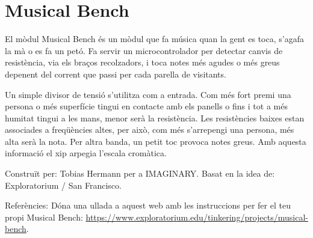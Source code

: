 \section{Musical Bench}
El mòdul Musical Bench és un mòdul que fa música quan la gent es toca, s'agafa la mà o es fa un petó. Fa servir un microcontrolador per detectar canvis de resistència, via els braços recolzadors, i toca notes més agudes o més greus depenent del corrent que passi per cada parella de visitants. 

Un simple divisor de tensió s'utilitza com a entrada. Com més fort premi una persona o més superfície tingui en contacte amb els panells o fins i tot a més humitat tingui a les mans, menor serà la resistència. Les resistències baixes estan associades a freqüències altes, per això, com més s'arrepengi una persona, més alta serà la nota. Per altra banda, un petit toc provoca notes greus. Amb aquesta informació el xip arpegia l'escala cromàtica. 


\vfill
Construït per: Tobias Hermann per a IMAGINARY.
Basat en la idea de: Exploratorium / San Francisco.

Referències:
Dóna una ullada a aquest web amb les instruccions per fer el teu propi Musical Bench: \url{https://www.exploratorium.edu/tinkering/projects/musical-bench}.